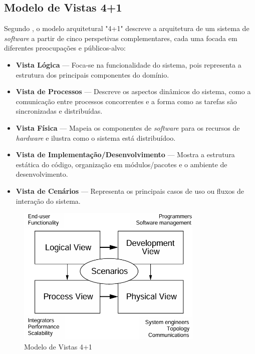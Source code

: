 \subsection{Modelo de Vistas 4+1}
\label{subsec:model4plus1}

Segundo \cite{Kruchten1995}, o modelo arquitetural "4+1" descreve a arquitetura de um sistema de \textit{software} a partir de cinco perspetivas complementares, cada uma focada em diferentes preocupações e públicos-alvo:

\begin{itemize}
\item \textbf{Vista Lógica} — Foca-se na funcionalidade do sistema, pois representa a estrutura dos principais componentes do domínio.

\item \textbf{Vista de Processos} — Descreve os aspectos dinâmicos do sistema, como a comunicação entre processos concorrentes e a forma como as tarefas são sincronizadas e distribuídas.

\item \textbf{Vista Física} — Mapeia os componentes de \textit{software} para os recursos de \textit{hardware} e ilustra como o sistema está distribuídoo.

\item \textbf{Vista de Implementação/Desenvolvimento} — Mostra a estrutura estática do código, organização em módulos/pacotes e o ambiente de desenvolvimento.

\item \textbf{Vista de Cenários} — Representa os principais casos de uso ou fluxos de interação do sistema.
\end{itemize}

\begin{figure}[H]
    \centering
    \includegraphics[width=3.5in,keepaspectratio]{frontmatter/assets/diagrams/4+1views.png}
    \caption{Modelo de Vistas 4+1}
    \label{fig:41viewmodel}
\end{figure}



